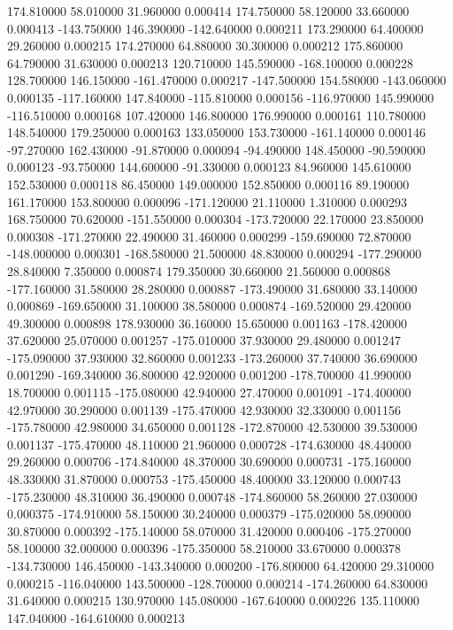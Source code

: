 174.810000 58.010000 31.960000 0.000414 
174.750000 58.120000 33.660000 0.000413 
-143.750000 146.390000 -142.640000 0.000211 
173.290000 64.400000 29.260000 0.000215 
174.270000 64.880000 30.300000 0.000212 
175.860000 64.790000 31.630000 0.000213 
120.710000 145.590000 -168.100000 0.000228 
128.700000 146.150000 -161.470000 0.000217 
-147.500000 154.580000 -143.060000 0.000135 
-117.160000 147.840000 -115.810000 0.000156 
-116.970000 145.990000 -116.510000 0.000168 
107.420000 146.800000 176.990000 0.000161 
110.780000 148.540000 179.250000 0.000163 
133.050000 153.730000 -161.140000 0.000146 
-97.270000 162.430000 -91.870000 0.000094 
-94.490000 148.450000 -90.590000 0.000123 
-93.750000 144.600000 -91.330000 0.000123 
84.960000 145.610000 152.530000 0.000118 
86.450000 149.000000 152.850000 0.000116 
89.190000 161.170000 153.800000 0.000096 
-171.120000 21.110000 1.310000 0.000293 
168.750000 70.620000 -151.550000 0.000304 
-173.720000 22.170000 23.850000 0.000308 
-171.270000 22.490000 31.460000 0.000299 
-159.690000 72.870000 -148.000000 0.000301 
-168.580000 21.500000 48.830000 0.000294 
-177.290000 28.840000 7.350000 0.000874 
179.350000 30.660000 21.560000 0.000868 
-177.160000 31.580000 28.280000 0.000887 
-173.490000 31.680000 33.140000 0.000869 
-169.650000 31.100000 38.580000 0.000874 
-169.520000 29.420000 49.300000 0.000898 
178.930000 36.160000 15.650000 0.001163 
-178.420000 37.620000 25.070000 0.001257 
-175.010000 37.930000 29.480000 0.001247 
-175.090000 37.930000 32.860000 0.001233 
-173.260000 37.740000 36.690000 0.001290 
-169.340000 36.800000 42.920000 0.001200 
-178.700000 41.990000 18.700000 0.001115 
-175.080000 42.940000 27.470000 0.001091 
-174.400000 42.970000 30.290000 0.001139 
-175.470000 42.930000 32.330000 0.001156 
-175.780000 42.980000 34.650000 0.001128 
-172.870000 42.530000 39.530000 0.001137 
-175.470000 48.110000 21.960000 0.000728 
-174.630000 48.440000 29.260000 0.000706 
-174.840000 48.370000 30.690000 0.000731 
-175.160000 48.330000 31.870000 0.000753 
-175.450000 48.400000 33.120000 0.000743 
-175.230000 48.310000 36.490000 0.000748 
-174.860000 58.260000 27.030000 0.000375 
-174.910000 58.150000 30.240000 0.000379 
-175.020000 58.090000 30.870000 0.000392 
-175.140000 58.070000 31.420000 0.000406 
-175.270000 58.100000 32.000000 0.000396 
-175.350000 58.210000 33.670000 0.000378 
-134.730000 146.450000 -143.340000 0.000200 
-176.800000 64.420000 29.310000 0.000215 
-116.040000 143.500000 -128.700000 0.000214 
-174.260000 64.830000 31.640000 0.000215 
130.970000 145.080000 -167.640000 0.000226 
135.110000 147.040000 -164.610000 0.000213 
